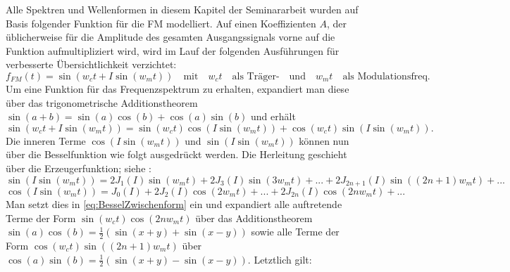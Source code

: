 Alle Spektren und Wellenformen in diesem Kapitel der Seminararbeit wurden auf Basis folgender Funktion für die FM modelliert. Auf einen Koeffizienten $A$, der üblicherweise für die Amplitude des gesamten Ausgangssignals vorne auf die Funktion aufmultipliziert wird, wird im Lauf der folgenden Ausführungen für verbesserte Übersichtlichkeit verzichtet:
\label{matze:simplefm}
\begin{equation} \label{eq:SimpleFM}
f_{FM}(t) = \sin(w_ct + I\sin(w_mt)) \quad \text{mit} \quad w_ct \quad \text{als Träger-} \quad \text{und} \quad w_mt \quad \text{als Modulationsfreq.}
\end{equation}
Um eine Funktion für das Frequenzspektrum zu erhalten, expandiert man diese über das trigonometrische Additionstheorem \begin{math} \sin(a + b) = \sin(a)\cos(b)+\cos(a)\sin(b) \end{math} und erhält
\begin{equation}\label{eq:BesselZwischenform}
\sin(w_ct + I\sin(w_mt)) = \sin(w_ct)\cos(I\sin(w_mt)) + \cos(w_ct)\sin(I\sin(w_mt)).
\end{equation}
Die inneren Terme \begin{math} \cos(I\sin(w_mt)) \end{math} und \begin{math} \sin(I\sin(w_mt)) \end{math} können nun über die Besselfunktion wie folgt ausgedrückt werden. Die Herleitung geschieht über die Erzeugerfunktion; siehe \cite[S.361, Satz~9.1.42 und Satz~9.1.43]{abramowitz}:
\begin{equation}\label{eq:Besselsin}
\sin(I\sin(w_mt)) = 2J_1(I)\sin(w_mt)+2J_3(I)\sin(3w_mt)+...+2J_{2n+1}(I)\sin((2n+1)w_mt)+...
\end{equation}
\begin{equation}\label{eq:Besselcos}
\cos(I\sin(w_mt)) = J_0(I)+2J_2(I)\cos(2w_mt)+...+2J_{2n}(I)\cos(2nw_mt)+...
\end{equation}
Man setzt dies in \ref{eq:BesselZwischenform} ein und expandiert alle auftretende Terme der Form \begin{math} \sin(w_ct)\cos(2nw_mt) \end{math} über das Additionstheorem \begin{math} \sin(a)\cos(b) = \frac{1}{2}\left(\sin(x+y)+\sin(x-y)\right) \end{math} sowie alle Terme der Form \begin{math} \cos(w_ct)\sin((2n+1)w_mt) \end{math} über  \begin{math} \cos(a)\sin(b) = \frac{1}{2}\left(\sin(x+y)-\sin(x-y)\right) \end{math}. Letztlich gilt: 
